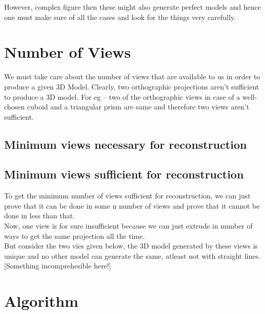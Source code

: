 \documentclass[12pt]{report}
\begin{document}
However, complex figure then these might also generate perfect models and hence one must make sure of all the cases and look for the things very carefully.
\\
\section{Number of Views}

We must take care about the number of views that are available to us in order to produce a given 3D Model. Clearly, two orthographic projections aren’t sufficient to produce a 3D model. For eg – two of the orthographic views in case of a well-chosen cuboid and a triangular prism are same and therefore two views aren’t sufficient. 
\\

\subsection{Minimum views necessary for reconstruction}

\subsection{Minimum views sufficient for reconstruction}
To get the minimum number of views sufficient for reconstruction, we can just prove that it can be done in some n number of views and prove that it cannot be done in less than that. 
\\
Now, one view is for sure insufficient because we can just extrude in number of ways to get the same projection all the time.
\\
But consider the two vies given below, the 3D model generated by these views is unique and no other model can generate the same, atleast not with straight lines.
\\

[Something incomprehesible here!]

%

\section{Algorithm}
\end{document}
